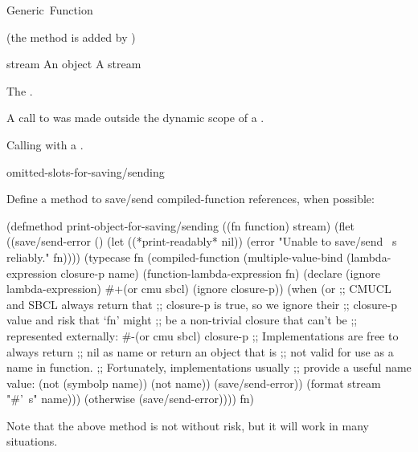 \documentclass[10pt,twoside,english,pdftex]{article}
\begin{document}
\begin{functiondoc}{Generic~Function}
\fnpackage {}

\fnmodule {} (the  method is added by
)

\fnargs
\begin{args}{stream}
\arg[object] An object
\arg[stream] A stream
\end{args}

\fnreturns The .

\fnerrors A call to  was made
outside the dynamic scope of a
.

Calling  with a
.

\begin{alsos}{omitted-slots-for-saving/sending}
\end{alsos}

\fnexample Define a method to save/send compiled-function references,
when possible:
%
\W\supp
\begin{example}
  (defmethod print-object-for-saving/sending ((fn function)
                                              stream)
    (flet ((save/send-error ()
             (let ((*print-readably* nil))
               (error "Unable to save/send ~s reliably." fn))))
      (typecase fn
        (compiled-function
         (multiple-value-bind (lambda-expression closure-p name)
             (function-lambda-expression fn)
           (declare (ignore lambda-expression)
                    #+(or cmu sbcl)
                    (ignore closure-p))
           (when (or 
                  ;; CMUCL and SBCL always return that
                  ;; closure-p is true, so we ignore their
                  ;; closure-p value and risk that `fn' might
                  ;; be a non-trivial closure that can't be
                  ;; represented externally:
                  #-(or cmu sbcl)
                  closure-p
                  ;; Implementations are free to always return
                  ;; nil as name or return an object that is
                  ;; not valid for use as a name in function.
                  ;; Fortunately, implementations usually
                  ;; provide a useful name value:
                  (not (symbolp name))
                  (not name))
             (save/send-error))
           (format stream "#'~s" name)))
        (otherwise (save/send-error))))
    fn)
\end{example}
Note that the above method is not without risk, but it will work in
many situations.
\end{functiondoc}
\end{document}
